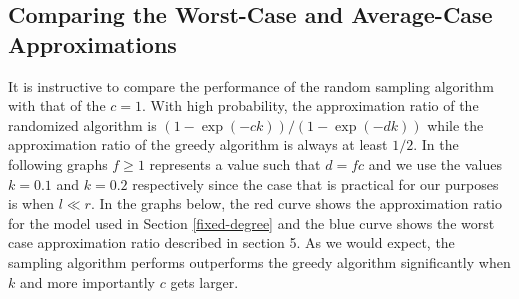 \subsection{Comparing the Worst-Case and Average-Case Approximations}
\label{worst-vs-avg}

\iffalse
In this section, we show that the the results of Section
\ref{fixed-degree} that hold in expectation also hold in the worst
case with high probability using concentration bounds. We can convert
the expectation results to a lower bound that holds with high
probability using concentration results like Chernoff bounds. While
Chernoff bounds are usually stated for independent variables, the
variant below holds for any number pairwise non-positively correlated
variables.

\begin{thm}
Let $X_1,\ldots, X_n$ be non-positively correlated variables. If $X=\sum_{i=1}^n X_i$, then for any $\delta\geq 0$
\[ Pr[X \geq (1+\delta)\E[X] ] \leq \left(\frac{e^\delta}{(1+\delta)^{1+\delta}}\right)^{\E[X]} \]
\end{thm}

Now note that the variables $1-X_v$ for each $v\in R$ are
non-positively correlated. In particular, if $N(v)$ and $N(v')$ are
disjoint, then $1-X_v$ and $1-X_{v'}$ are independent. Otherwise, $v$
not claiming any edges can only increase the probability that $v'$
gets an edge from any vertex $u\in N(v)\cap N(v')$, so the variables
would be negatively correlated. Setting $\delta=1$ in the
theorem above now proves the following:

\begin{thm}
The random sampling algorithm produces a solution of size at least $r(1-2\exp(-ck))$ with probability at least $1-(e/4)^{r\exp(-ck)}$.
\end{thm}

That is, the probability of producing a constant factor approximation decreases exponentially with $r$.

With these high probability bounds in place, i
\fi

It is instructive to compare the performance of the random sampling
algorithm with that of the $c=1$. 
With high probability, the approximation ratio of the
randomized algorithm is $(1-\exp(-ck))/(1-\exp(-dk))$ while the
approximation ratio of the greedy algorithm is always at least
$1/2$. In the following graphs $f\geq 1$ represents a value such that
$d=fc$ and we use the values $k=0.1$ and $k=0.2$ respectively since
the case that is practical for our purposes is when $l \ll r$. In the
graphs below, the red curve shows the approximation ratio for the
model used in Section \ref{fixed-degree} and the blue curve shows the
worst case approximation ratio described in section 5. As we would
expect, the sampling algorithm performs outperforms the greedy
algorithm significantly when $k$ and more importantly $c$ gets larger.

